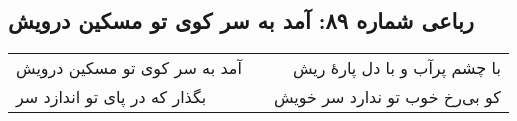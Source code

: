 \begin{center}
\section*{رباعی شماره ۸۹: آمد به سر کوی تو مسکین درویش}
\label{sec:089}
\begin{longtable}{l p{0.5cm} r}
آمد به سر کوی تو مسکین درویش
&&
با چشم پرآب و با دل پارهٔ ریش
\\
بگذار که در پای تو اندازد سر
&&
کو بی‌رخ خوب تو ندارد سر خویش
\\
\end{longtable}
\end{center}
